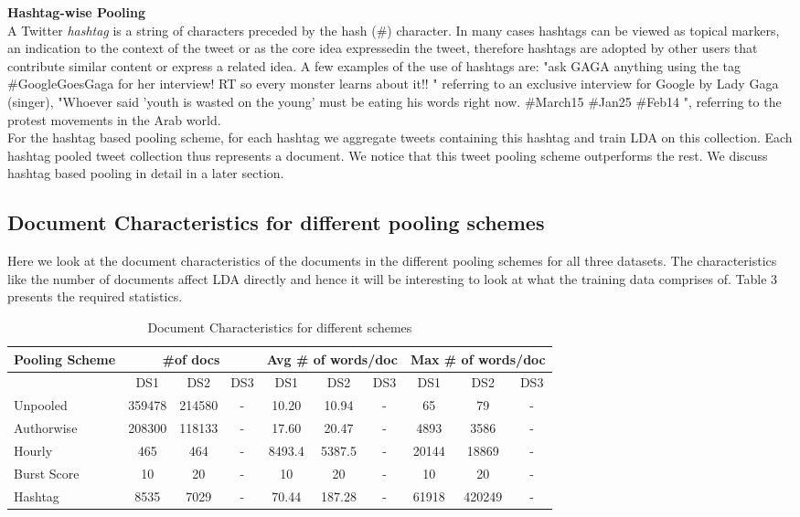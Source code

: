 \documentclass[10pt,a5paper,twoside]{article}
\begin{document}
\begin{compactenum}
\item  \textbf{Hashtag-wise Pooling}
\\
A Twitter \textit{hashtag} is a string of characters preceded by the hash (\#) character. In many cases hashtags can be viewed as topical markers, an indication to the context of the tweet or as the core idea expressedin the tweet, therefore hashtags are adopted by other users that contribute similar content or express a related idea. A few examples of the use of hashtags are: "ask GAGA anything using the tag \#GoogleGoesGaga for her interview! RT so every monster learns about it!! " referring to an exclusive interview for Google by Lady Gaga (singer), "Whoever
said 'youth is wasted on the young' must be eating his words right now. \#March15 \#Jan25 \#Feb14 ", referring to the protest movements in the Arab world.
\\
For the hashtag based pooling scheme, for each hashtag we aggregate tweets containing this hashtag and train LDA on this collection. Each hashtag pooled tweet collection thus represents a document. We notice that this tweet pooling scheme outperforms the rest. We discuss hashtag based pooling in detail in a later section.

\end{compactenum}

\subsection{Document Characteristics for different pooling schemes}
Here we look at the document characteristics of the documents in the different pooling schemes for all three datasets. The characteristics like the number of documents affect LDA directly and hence it will be interesting to look at what the training data comprises of. Table 3 presents the required statistics.

\begin{table}[!h]
\setcounter{table}{3}
\centering
	\begin{tabular}{|l|ccc|ccc|ccc|}
	\hline
	Pooling Scheme  & \multicolumn {3}{c}{\#of docs} & \multicolumn {3}{c}{Avg \# of words/doc} & \multicolumn {3}{c}{Max \# of words/doc}\\
	\hline
	 & DS1 & DS2 & DS3 &  DS1 & DS2 & DS3 &  DS1 & DS2 & DS3\\
	\hline
	Unpooled & 359478 & 214580 & - & 10.20 & 10.94 & - & 65 & 79 & - \\
	\hline
	Authorwise & 208300 & 118133 & - & 17.60 & 20.47 & - & 4893 & 3586 & - \\
	\hline
	Hourly & 465 & 464 & - & 8493.4 & 5387.5 & - & 20144 & 18869 & - \\
	\hline
	Burst Score & 10 & 20 & - & 10 & 20 & - & 10 & 20 & - \\
	\hline
	Hashtag & 8535 & 7029 & - & 70.44 & 187.28 & - & 61918 & 420249 & - \\
	\hline
	\end{tabular}
\caption{Document Characteristics for different schemes}\label{Table}
\end{table}
\end{document}

